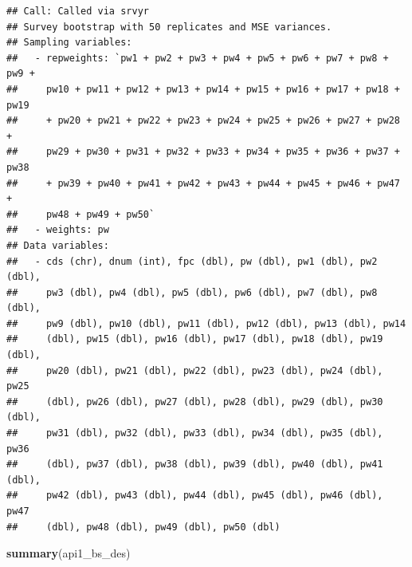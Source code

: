 \documentclass[
]{krantz}
\makeatletter
\newenvironment{Shaded}{\begin{snugshade}}{\end{snugshade}}
\newcommand{\FunctionTok}[1]{\textcolor[rgb]{0.27,0.27,0.27}{\textbf{#1}}}
\newcommand{\NormalTok}[1]{#1}
\newenvironment{kframe}{%
\medskip{}
\setlength{\fboxsep}{.8em}
 \def\at@end@of@kframe{}%
 \ifinner\ifhmode%
  \def\at@end@of@kframe{\end{minipage}}%
  \begin{minipage}{\columnwidth}%
 \fi\fi%
 \def\FrameCommand##1{\hskip\@totalleftmargin \hskip-\fboxsep
 \colorbox{shadecolor}{##1}\hskip-\fboxsep
     \hskip-\linewidth \hskip-\@totalleftmargin \hskip\columnwidth}%
 \MakeFramed {\advance\hsize-\width
   \@totalleftmargin\z@ \linewidth\hsize
   \@setminipage}}%
 {\par\unskip\endMakeFramed%
 \at@end@of@kframe}
\renewenvironment{Shaded}{\begin{kframe}}{\end{kframe}}
\makeatother
\begin{document}
\begin{verbatim}
## Call: Called via srvyr
## Survey bootstrap with 50 replicates and MSE variances.
## Sampling variables:
##   - repweights: `pw1 + pw2 + pw3 + pw4 + pw5 + pw6 + pw7 + pw8 + pw9 +
##     pw10 + pw11 + pw12 + pw13 + pw14 + pw15 + pw16 + pw17 + pw18 + pw19
##     + pw20 + pw21 + pw22 + pw23 + pw24 + pw25 + pw26 + pw27 + pw28 +
##     pw29 + pw30 + pw31 + pw32 + pw33 + pw34 + pw35 + pw36 + pw37 + pw38
##     + pw39 + pw40 + pw41 + pw42 + pw43 + pw44 + pw45 + pw46 + pw47 +
##     pw48 + pw49 + pw50` 
##   - weights: pw 
## Data variables: 
##   - cds (chr), dnum (int), fpc (dbl), pw (dbl), pw1 (dbl), pw2 (dbl),
##     pw3 (dbl), pw4 (dbl), pw5 (dbl), pw6 (dbl), pw7 (dbl), pw8 (dbl),
##     pw9 (dbl), pw10 (dbl), pw11 (dbl), pw12 (dbl), pw13 (dbl), pw14
##     (dbl), pw15 (dbl), pw16 (dbl), pw17 (dbl), pw18 (dbl), pw19 (dbl),
##     pw20 (dbl), pw21 (dbl), pw22 (dbl), pw23 (dbl), pw24 (dbl), pw25
##     (dbl), pw26 (dbl), pw27 (dbl), pw28 (dbl), pw29 (dbl), pw30 (dbl),
##     pw31 (dbl), pw32 (dbl), pw33 (dbl), pw34 (dbl), pw35 (dbl), pw36
##     (dbl), pw37 (dbl), pw38 (dbl), pw39 (dbl), pw40 (dbl), pw41 (dbl),
##     pw42 (dbl), pw43 (dbl), pw44 (dbl), pw45 (dbl), pw46 (dbl), pw47
##     (dbl), pw48 (dbl), pw49 (dbl), pw50 (dbl)
\end{verbatim}

\begin{Shaded}
\begin{Highlighting}[]
\FunctionTok{summary}\NormalTok{(api1\_bs\_des)}
\end{Highlighting}
\end{Shaded}
\end{document}
